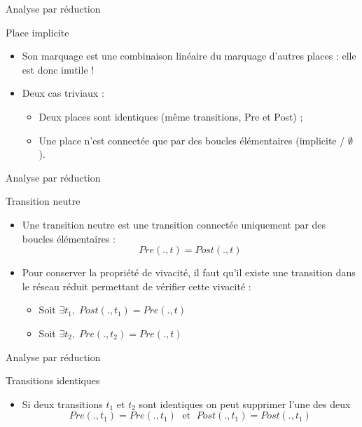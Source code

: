 \documentclass[compress]{beamer}
\begin{document}
\begin{frame}{Analyse par réduction}
\begin{block}{Place implicite}
	\begin{itemize}
	\item Son marquage est une combinaison linéaire du marquage d'autres places : elle est donc inutile !
	\item Deux cas triviaux :
		\begin{itemize}
		\item Deux places sont identiques (même transitions, Pre et Post) ;
		\item Une place n'est connectée que par des boucles élémentaires (implicite / $\emptyset$).
		\end{itemize}
	\end{itemize}	
\end{block}
\end{frame}

\begin{frame}{Analyse par réduction}
\begin{block}{Transition neutre}
	\begin{itemize}
	\item Une transition neutre est une transition connectée uniquement par des boucles élémentaires :
	$$Pre(., t) = Post(., t)$$
	\item Pour conserver la propriété de vivacité, il faut qu'il existe une transition dans le réseau réduit permettant de vérifier cette vivacité :
		\begin{itemize}
		\item Soit $\exists t_1, \; Post(., t_1) = Pre(., t)$
		\item Soit $\exists t_2, \; Pre(., t_2) = Pre(., t)$
		\end{itemize}
	\end{itemize}	
\end{block}
\end{frame}

\begin{frame}{Analyse par réduction}
\begin{block}{Transitions identiques}
	\begin{itemize}
	\item Si deux transitions $t_1$ et $t_2$ sont identiques on peut supprimer l'une des deux
	$$Pre(., t_1) = Pre(., t_1) \; \mbox{ et } \; Post(., t_1) = Post(., t_1)$$
	\end{itemize}	
\end{block}
\end{frame}
\end{document}
